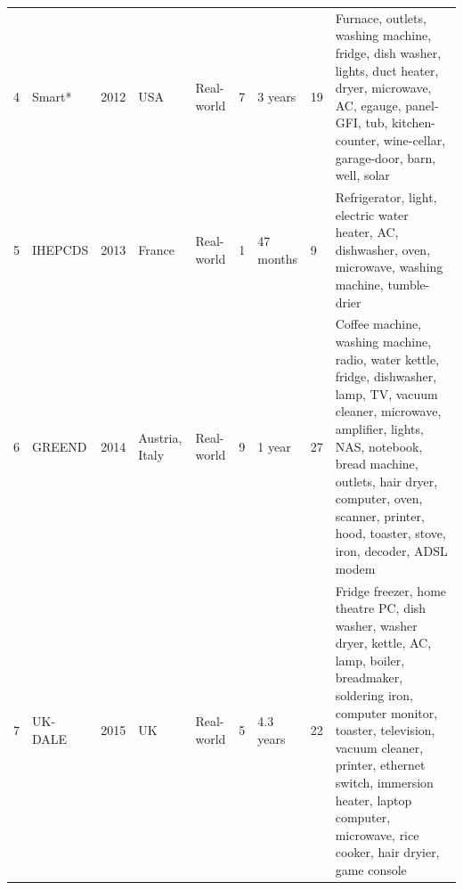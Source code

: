 \begin{table}
{\begin{tabular}{lllp{}lp{}lp{}p{}}
            4           & Smart*           & 2012          & USA               & Real-world    & 7                  & 3 years         & 19                     & Furnace, outlets, washing machine, fridge, dish washer, lights, duct heater, dryer, microwave, AC, egauge, panel-GFI, tub, kitchen-counter, wine-cellar, garage-door, barn, well, solar                                                                                                                                                                                                                                                                       \\
            5           & IHEPCDS          & 2013          & France            & Real-world    & 1                  & 47 months       & 9                      & Refrigerator, light, electric water heater, AC, dishwasher, oven, microwave, washing machine, tumble-drier                                                                                                                                                                                                                                                                                                                                                    \\
            6           & GREEND           & 2014          & Austria, Italy    & Real-world    & 9                  & 1 year          & 27                     & Coffee machine, washing machine, radio, water kettle, fridge, dishwasher, lamp, TV, vacuum cleaner, microwave, amplifier, lights, NAS, notebook, bread machine, outlets, hair dryer, computer, oven, scanner, printer, hood, toaster, stove, iron, decoder, ADSL modem                                                                                                                                                                                        \\
            7           & UK-DALE          & 2015          & UK                & Real-world    & 5                  & 4.3 years       & 22                     & Fridge freezer, home theatre PC, dish washer, washer dryer, kettle, AC, lamp, boiler,  breadmaker, soldering iron, computer monitor, toaster, television, vacuum cleaner, printer, ethernet switch, immersion heater, laptop computer, microwave, rice cooker, hair dryier, game console                                                                                                                                                                      \\

\end{tabular}}
\end{table}

